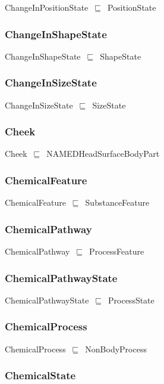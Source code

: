 \documentclass{article}
\begin{document}
ChangeInPositionState~\ensuremath{\sqsubseteq}~PositionState~

\subsubsection*{ChangeInShapeState}

ChangeInShapeState~\ensuremath{\sqsubseteq}~ShapeState~

\subsubsection*{ChangeInSizeState}

ChangeInSizeState~\ensuremath{\sqsubseteq}~SizeState~

\subsubsection*{Cheek}

Cheek~\ensuremath{\sqsubseteq}~NAMEDHeadSurfaceBodyPart~

\subsubsection*{ChemicalFeature}

ChemicalFeature~\ensuremath{\sqsubseteq}~SubstanceFeature~

\subsubsection*{ChemicalPathway}

ChemicalPathway~\ensuremath{\sqsubseteq}~ProcessFeature~

\subsubsection*{ChemicalPathwayState}

ChemicalPathwayState~\ensuremath{\sqsubseteq}~ProcessState~

\subsubsection*{ChemicalProcess}

ChemicalProcess~\ensuremath{\sqsubseteq}~NonBodyProcess~

\subsubsection*{ChemicalState}
\end{document}
